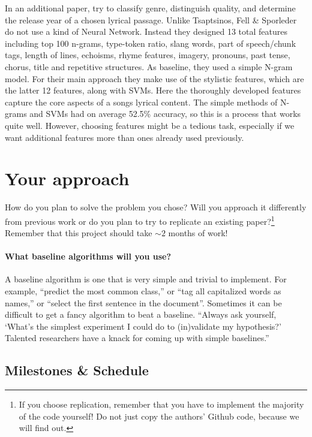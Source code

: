 \documentclass[11pt,a4paper]{article}
\begin{document}
In an additional paper,  try to classify genre, distinguish quality, and determine the release year of a chosen lyrical passage. 
Unlike Tsaptsinos, Fell \& Sporleder do not use a kind of Neural Network. 
Instead they designed 13 total features including top 100 n-grams, type-token ratio, slang words, part of speech/chunk tags, length of lines, echoisms, rhyme features, imagery, pronouns, past tense, chorus, title and repetitive structures. 
As baseline, they used a simple N-gram model. 
For their main approach they make use of the stylistic features, which are the latter 12 features, along with SVMs. 
Here the thoroughly developed features capture the core aspects of a songs lyrical content. 
The simple methods of N-grams and SVMs had on average 52.5\% accuracy, so this is a process that works quite well. 
However, choosing features might be a tedious task, especially if we want additional features more than ones already used previously. 

\section{Your approach}
How do you plan to solve the problem you chose? Will you approach it differently from previous work or do you plan to try to replicate an existing paper?\footnote{If you choose replication, remember that you have to implement the majority of the code yourself! Do not just copy the authors' Github code, because we will find out.} Remember that this project should take $\sim 2$ months of work!

\paragraph{What baseline algorithms will you use?}
A baseline algorithm is one that is very simple and trivial to implement. For example, “predict the most common class,” or “tag all capitalized words as names,” or “select the first sentence in the document”. Sometimes it can be difficult to get a fancy algorithm to beat a baseline. “Always ask yourself, ‘What’s the simplest experiment I could do to (in)validate my hypothesis?’ Talented researchers have a knack for coming up with simple baselines.”

\subsection{Milestones \& Schedule}
\end{document}
